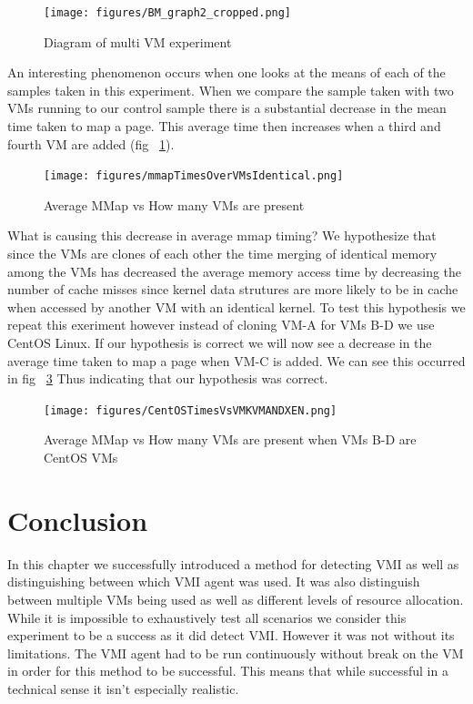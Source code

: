 	\begin{figure}[p!]\label{Fig4VMTest}
	  \centering
	  \texttt{[image: figures/BM\_graph2\_cropped.png]}
	  \caption{Diagram of multi VM experiment} 
	\end{figure}


An interesting phenomenon occurs when one looks at the means of each of the samples taken in this experiment. When we compare the sample taken with two VMs running to our control sample there is a substantial decrease in the mean time taken to map a page. This average time then increases when a third and fourth VM are added (fig ~\ref{Fig4VMTest}).

	\begin{figure}[p!]\label{Fig4VMTestCentOS}
		\centering
		\texttt{[image: figures/mmapTimesOverVMsIdentical.png]}
		\caption{Average MMap vs How many VMs are present}
	\end{figure}

What is causing this decrease in average mmap timing? We hypothesize that since the VMs are clones of each other the time merging of identical memory among the VMs has decreased the average memory access time by decreasing the number of cache misses since kernel data strutures are more likely to be in cache when accessed by another VM with an identical kernel. To test this hypothesis we repeat this exeriment however instead of cloning VM-A for VMs B-D we use CentOS Linux. If our hypothesis is correct we will now see a decrease in the average time taken to map a page when VM-C is added. We can see this occurred in fig ~\ref{Fig4VMTestCentOS} Thus indicating that our hypothesis was correct.

\begin{figure}[p!]\label{Fig4VMTestCentOS}
		\centering
		\texttt{[image: figures/CentOSTimesVsVMKVMANDXEN.png]}
		\caption{Average MMap vs How many VMs are present when VMs B-D are CentOS VMs}
	\end{figure}

 

\section{Conclusion}
In this chapter we successfully introduced a method for detecting VMI as well as distinguishing between which VMI agent was used. It was also distinguish between multiple VMs being used as well as different levels of resource allocation. While it is impossible to exhaustively test all scenarios we consider this experiment to be a success as it did detect VMI. However it was not without its limitations. The VMI agent had to be run continuously without break on the VM in order for this method to be successful. This means that while successful in a technical sense it isn't especially realistic. 